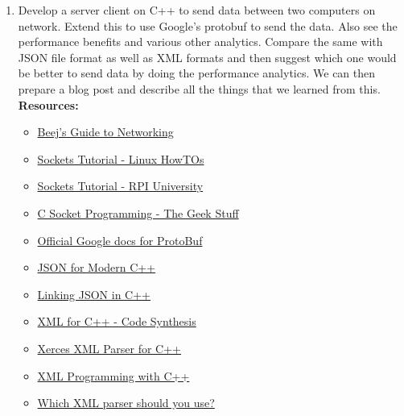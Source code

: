 \documentclass{article}
\begin{document}
\begin{enumerate}
\item Develop a server client on C++ to send data between two computers on network. Extend this to use Google’s protobuf to send the data. Also see the performance benefits and various other analytics. Compare the same with JSON file format as well as XML formats and then suggest which one would be better to send data by doing the performance analytics. We can then prepare a blog post and describe all the things that we learned from this.
{\newline}{\newline}
{\bf Resources:}
    \begin{itemize}
        \item \href{http://beej.us/guide/bgnet/}{Beej's Guide to Networking}
        \item \href{http://www.linuxhowtos.org/C_C++/socket.htm}{Sockets Tutorial - Linux HowTOs}
        \item \href{http://www.cs.rpi.edu/~moorthy/Courses/os98/Pgms/socket.html}{Sockets Tutorial - RPI University}
        \item \href{http://www.thegeekstuff.com/2011/12/c-socket-programming/}{C Socket Programming - The Geek Stuff}
        \item \href{https://developers.google.com/protocol-buffers/docs/overview}{Official Google docs for ProtoBuf}
        \item \href{https://github.com/nlohmann/json}{JSON for Modern C++}
        \item \href {https://github.com/open-source-parsers/jsoncpp}{Linking JSON in C++}
        \item \href{http://www.codesynthesis.com/products/xsd/}{XML for C++ - Code Synthesis}
        \item \href{http://xerces.apache.org/xerces-c/}{Xerces XML Parser for C++}
        \item \href{http://www.xml.com/pub/a/1999/11/cplus/}{XML Programming with C++}
        \item \href{http://stackoverflow.com/questions/170686/what-is-the-best-open-xml-parser-for-c}{Which XML parser should you use?}
    \end{itemize}

\end{enumerate}%
\end{document}
